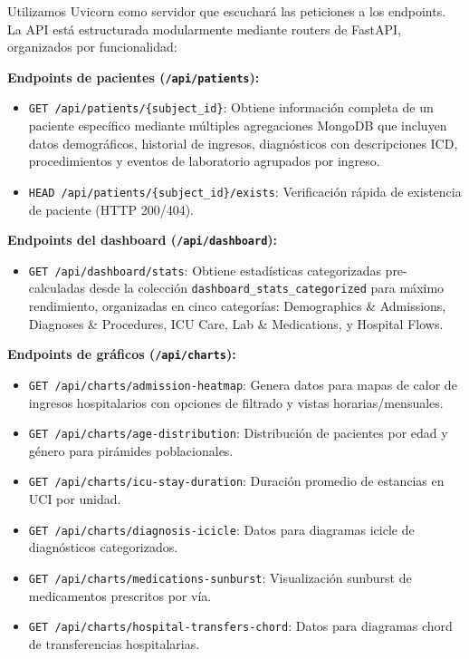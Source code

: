 Utilizamos Uvicorn \cite{uvicorn} como servidor que escuchará las peticiones a los endpoints. La API está estructurada modularmente mediante routers de FastAPI, organizados por funcionalidad:

\textbf{Endpoints de pacientes (\texttt{/api/patients}):}
\begin{itemize}
\item \texttt{GET /api/patients/\{subject\_id\}}: Obtiene información completa de un paciente específico mediante múltiples agregaciones MongoDB que incluyen datos demográficos, historial de ingresos, diagnósticos con descripciones ICD, procedimientos y eventos de laboratorio agrupados por ingreso.
\item \texttt{HEAD /api/patients/\{subject\_id\}/exists}: Verificación rápida de existencia de paciente (HTTP 200/404).
\end{itemize}


\newpage
\textbf{Endpoints del dashboard (\texttt{/api/dashboard}):}
\begin{itemize}
\item \texttt{GET /api/dashboard/stats}: Obtiene estadísticas categorizadas pre-calculadas desde la colección \texttt{dashboard\_stats\_categorized} para máximo rendimiento, organizadas en cinco categorías: Demographics \& Admissions, Diagnoses \& Procedures, ICU Care, Lab \& Medications, y Hospital Flows.
\end{itemize}

\textbf{Endpoints de gráficos (\texttt{/api/charts}):}
\begin{itemize}
\item \texttt{GET /api/charts/admission-heatmap}: Genera datos para mapas de calor de ingresos hospitalarios con opciones de filtrado y vistas horarias/mensuales.
\item \texttt{GET /api/charts/age-distribution}: Distribución de pacientes por edad y género para pirámides poblacionales.
\item \texttt{GET /api/charts/icu-stay-duration}: Duración promedio de estancias en UCI por unidad.
\item \texttt{GET /api/charts/diagnosis-icicle}: Datos para diagramas icicle de diagnósticos categorizados.
\item \texttt{GET /api/charts/medications-sunburst}: Visualización sunburst de medicamentos prescritos por vía.
\item \texttt{GET /api/charts/hospital-transfers-chord}: Datos para diagramas chord de transferencias hospitalarias.
\end{itemize}

